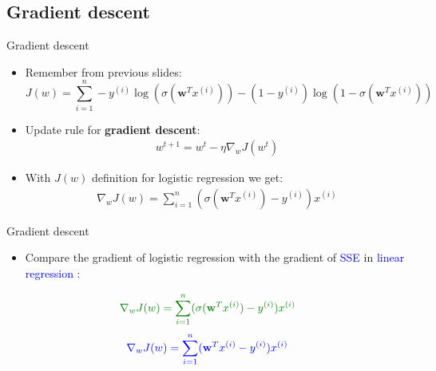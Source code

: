 \documentclass[serif, aspectratio=169]{beamer}
\begin{document}

\subsection{Gradient descent}
\begin{frame}{Gradient descent}
    \begin{itemize}
    \item Remember from previous slides:
        \[
        J(w) = \sum_{i=1}^{n}-y^{(i)}\log (\sigma (\mathbf{w}^T x^{(i)})) - 
            (1-y^{(i)})\log (1 - \sigma (\mathbf{w}^T x^{(i)}))
        \]
    \item Update rule for \textbf{gradient descent}: 
        \begin{align*}
            w^{t+1} = w^t - \eta \nabla _w J(w^t)
        \end{align*}
    \item With $J(w)$ definition for logistic regression we get:
        \begin{align*}
            \nabla _w J(w) = \sum_{i=1}^{n} (\sigma (\mathbf{w}^T x^{(i)}) - y^{(i)})x^{(i)} 
        \end{align*}
        
    \end{itemize}
\end{frame}
\begin{frame}{Gradient descent}
    \begin{itemize}
    
    \item Compare the gradient of \textcolor{deepgreen}{logistic regression} with the gradient of \textcolor{blue}{SSE} in \textcolor{blue}{linear regression} :
    \end{itemize}
        \begin{align*}
        \color{deepgreen}
             \nabla _w J(w) = \sum_{i=1}^{n} (\sigma (\mathbf{w}^Tx^{(i)}) - y^{(i)})x^{(i)} 
        \end{align*}
        \begin{align*}
            \color{blue}
            \nabla _w J(w) = \sum_{i=1}^{n} (\mathbf{w}^Tx^{(i)} - y^{(i)})x^{(i)}
        \end{align*}
        
\end{frame}
\end{document}
